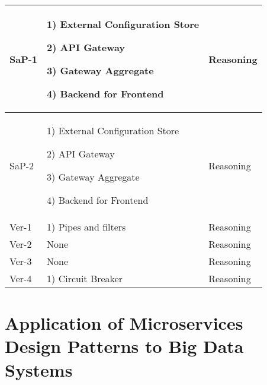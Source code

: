 \documentclass[conference]{IEEEtran}
\begin{document}
\begin{center}
\begin{table*}
\begin{tabular}{ | m{2cm} | m{8cm} |  m{2cm} |}
        \\
        \hline

        SaP-1 &  

        1) External Configuration Store

        2) API Gateway

        3) Gateway Aggregate

        4) Backend for Frontend 
        
        & Reasoning
        
        \\
        \hline

        SaP-2 &  

        1) External Configuration Store

        2) API Gateway

        3) Gateway Aggregate

        4) Backend for Frontend 
        
        & Reasoning
        
        \\
        \hline

        Ver-1 &  

        1) Pipes and filters
        
        & Reasoning
        
        \\
        \hline

        Ver-2 &  
        None 
        & Reasoning
        
        \\
        \hline

        
        Ver-3 &  
        
        None

        & Reasoning
        
        \\
        \hline

             
        Ver-4 &  
        
        1) Circuit Breaker

        & Reasoning
        
        \\
        \hline

    \end{tabular}
    \end{table*}
\end{center}


\section{Application of Microservices Design Patterns to Big Data Systems}
\end{document}
